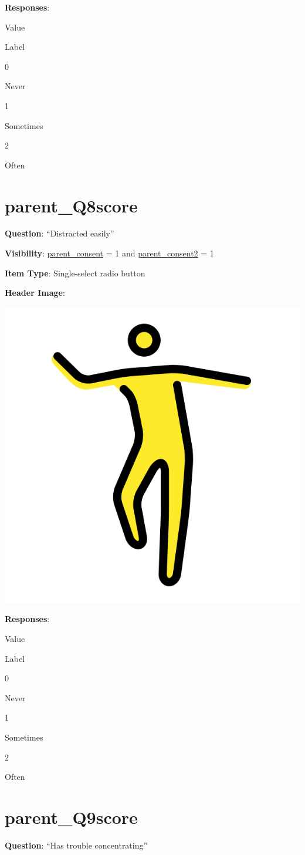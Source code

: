 \documentclass[]{book}
\begin{document}
\textbf{Responses}:

Value

Label

0

Never

1

Sometimes

2

Often

\hypertarget{parent_q8score}{%
\section{parent\_Q8score}\label{parent_q8score}}

\textbf{Question}: ``Distracted easily''

\textbf{Visibility}: \protect\hyperlink{parent_consent}{parent\_consent} = 1 and \protect\hyperlink{parent_consent2}{parent\_consent2} = 1

\textbf{Item Type}: Single-select radio button

\textbf{Header Image}:

\begin{flushleft}\includegraphics[width=0.33\linewidth]{downloadFigs4latex_HBN_PMHS_Codebook/parent_Q8score_headerImg} \end{flushleft}

\textbf{Responses}:

Value

Label

0

Never

1

Sometimes

2

Often

\hypertarget{parent_q9score}{%
\section{parent\_Q9score}\label{parent_q9score}}

\textbf{Question}: ``Has trouble concentrating''
\end{document}
